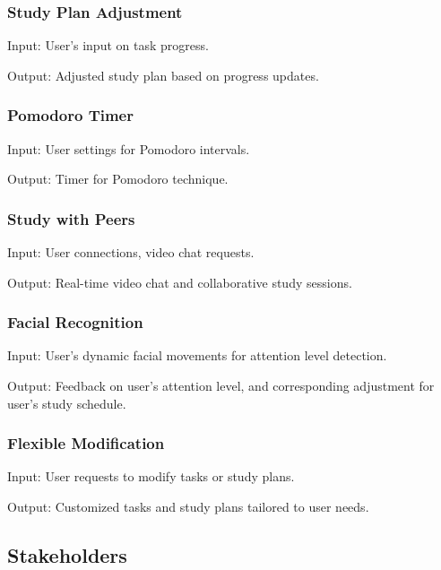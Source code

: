 \documentclass{article}
\begin{document}
\subsubsection{Study Plan Adjustment}
\vspace{1ex}

\noindent Input: User's input on task progress.

\noindent Output: Adjusted study plan based on progress updates.

\subsubsection{Pomodoro Timer}
\vspace{1ex}

\noindent Input: User settings for Pomodoro intervals.

\noindent Output: Timer for Pomodoro technique.


\subsubsection{Study with Peers}
\vspace{1ex}

\noindent Input: User connections, video chat requests.

\noindent Output: Real-time video chat and collaborative study sessions.
     

\subsubsection{Facial Recognition}
\vspace{1ex}

\noindent Input: User's dynamic facial movements for attention level detection.

\noindent Output: Feedback on user's attention level, and corresponding adjustment for user's study schedule.

\subsubsection{Flexible Modification}
\vspace{1ex}

\noindent Input: User requests to modify tasks or study plans.

\noindent Output: Customized tasks and study plans tailored to user needs.


\subsection{Stakeholders}
\end{document}

